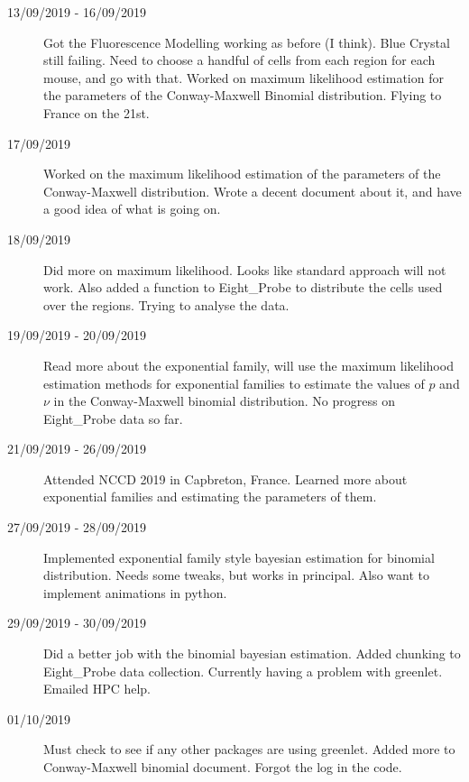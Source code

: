 \documentclass[a4paper,12pt]{article}
\theoremstyle{definition}
\begin{document}
\begin{description}
                                \item[13/09/2019 - 16/09/2019] Got the Fluorescence Modelling working as before (I think). Blue Crystal still failing. Need to choose a handful of cells from each region for each mouse, and go with that. Worked on maximum likelihood estimation for the parameters of the Conway-Maxwell Binomial distribution. Flying to France on the 21st.

                                \item[17/09/2019] Worked on the maximum likelihood estimation of the parameters of the Conway-Maxwell distribution. Wrote a decent document about it, and have a good idea of what is going on.

                                \item[18/09/2019] Did more on maximum likelihood. Looks like standard approach will not work. Also added a function to Eight\_Probe to distribute the cells used over the regions. Trying to analyse the data.

                                \item[19/09/2019 - 20/09/2019] Read more about the exponential family, will use the maximum likelihood estimation methods for exponential families to estimate the values of $p$ and $\nu$ in the Conway-Maxwell binomial distribution. No progress on Eight\_Probe data so far.

                                \item[21/09/2019 - 26/09/2019] Attended NCCD 2019 in Capbreton, France. Learned more about exponential families and estimating the parameters of them.

                                \item[27/09/2019 - 28/09/2019] Implemented exponential family style bayesian estimation for binomial distribution. Needs some tweaks, but works in principal. Also want to implement animations in python.

                                \item[29/09/2019 - 30/09/2019] Did a better job with the binomial bayesian estimation. Added chunking to Eight\_Probe data collection. Currently having a problem with greenlet. Emailed HPC help.

                                \item[01/10/2019] Must check to see if any other packages are using greenlet. Added more to Conway-Maxwell binomial document. Forgot the log in the code.


\end{description}
\end{document}
